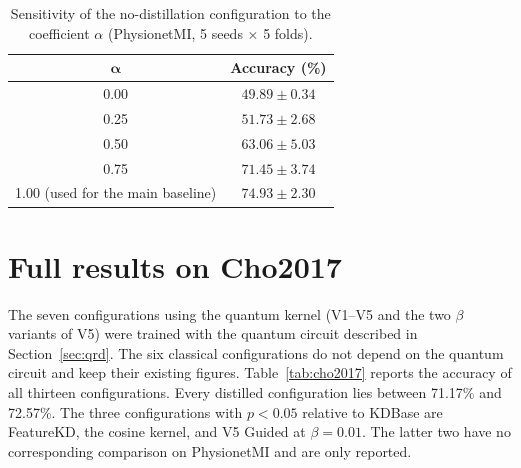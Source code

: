 \begin{table}[!htbp]
\centering
\caption{Sensitivity of the no-distillation configuration to the
coefficient $\alpha$ (PhysionetMI, 5 seeds $\times$ 5 folds).}
\label{tab:alphasweep}
\begin{tabular}{cc}
\toprule
$\boldsymbol{\alpha}$ & \textbf{Accuracy (\%)} \\
\midrule
0.00 & $49.89 \pm 0.34$ \\
0.25 & $51.73 \pm 2.68$ \\
0.50 & $63.06 \pm 5.03$ \\
0.75 & $71.45 \pm 3.74$ \\
1.00 (used for the main baseline) & $\boldsymbol{74.93 \pm 2.30}$ \\
\bottomrule
\end{tabular}
\end{table}
\FloatBarrier

\section{Full results on Cho2017}
\label{app:cho}

The seven configurations using the quantum kernel (V1--V5 and the two
$\beta$ variants of V5) were trained with the quantum circuit described
in Section~\ref{sec:qrd}. The six classical configurations do not depend
on the quantum circuit and keep their existing figures.
Table~\ref{tab:cho2017} reports the accuracy of all thirteen
configurations. Every distilled configuration lies between 71.17\% and
72.57\%. The three configurations with $p < 0.05$ relative to KDBase are
FeatureKD, the cosine kernel, and V5 Guided at $\beta = 0.01$. The latter
two have no corresponding comparison on PhysionetMI and are only
reported.

